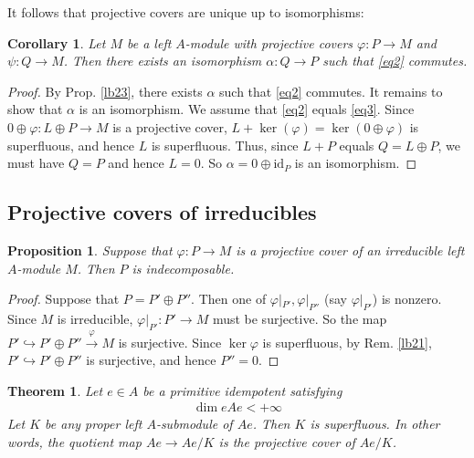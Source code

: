 \documentclass[11pt,b5paper,notitlepage]{article}
\theoremstyle{definition}
\theoremstyle{plain}
\newtheorem{thm}[df]{Theorem}
\newtheorem{pp}[df]{Proposition}
\newtheorem{co}[df]{Corollary}
\newcommand{\id}{\mathrm{id}}
\numberwithin{equation}{section}
\begin{document}
It follows that projective covers are unique up to isomorphisms:

\begin{co}\label{lb22}
Let $M$ be a left $A$-module with projective covers $\varphi:P\rightarrow M$ and $\psi:Q\rightarrow M$. Then there exists an isomorphism $\alpha:Q\rightarrow P$ such that \eqref{eq2} commutes.
\end{co}

\begin{proof}
By Prop. \ref{lb23}, there exists $\alpha$ such that \eqref{eq2} commutes. It remains to show that $\alpha$ is an isomorphism. We assume that \eqref{eq2} equals \eqref{eq3}. Since $0\oplus\varphi:L\oplus P\rightarrow M$ is a projective cover, $L+\ker(\varphi)=\ker(0\oplus\varphi)$ is superfluous, and hence $L$ is superfluous. Thus, since $L+P$ equals $Q=L\oplus P$, we must have $Q=P$ and hence $L=0$. So $\alpha=0\oplus\id_P$ is an isomorphism.  
\end{proof}



\subsection{Projective covers of irreducibles}


\begin{pp}\label{lb24}
Suppose that $\varphi:P\rightarrow M$ is a projective cover of an irreducible left $A$-module $M$. Then $P$ is indecomposable.
\end{pp}

\begin{proof}
Suppose that $P=P'\oplus P''$. Then one of $\varphi|_{P'},\varphi|_{P''}$ (say $\varphi|_{P'}$) is nonzero. Since $M$ is irreducible,  $\varphi|_{P'}:P'\rightarrow M$ must be surjective. So the map $P'\hookrightarrow P'\oplus P''\xrightarrow{\varphi}M$ is surjective. Since $\ker\varphi$ is superfluous, by Rem. \ref{lb21}, $P'\hookrightarrow P'\oplus P''$ is surjective, and hence $P''=0$.
\end{proof}








\begin{thm}\label{lb8}
Let $e\in A$ be a primitive idempotent satisfying
\begin{align*}
\dim eAe<+\infty
\end{align*}
Let $K$ be any proper left $A$-submodule of $Ae$. Then $K$ is superfluous. In other words, the quotient map $Ae\rightarrow Ae/K$ is the projective cover of $Ae/K$.
\end{thm}
\end{document}
